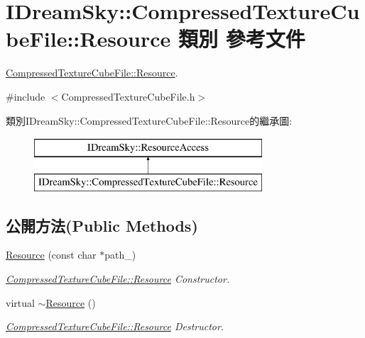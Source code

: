 \hypertarget{class_i_dream_sky_1_1_compressed_texture_cube_file_1_1_resource}{}\section{I\+Dream\+Sky\+:\+:Compressed\+Texture\+Cube\+File\+:\+:Resource 類別 參考文件}
\label{class_i_dream_sky_1_1_compressed_texture_cube_file_1_1_resource}


\hyperlink{class_i_dream_sky_1_1_compressed_texture_cube_file_1_1_resource}{Compressed\+Texture\+Cube\+File\+::\+Resource}.  




{\ttfamily \#include $<$Compressed\+Texture\+Cube\+File.\+h$>$}

類別\+I\+Dream\+Sky\+:\+:Compressed\+Texture\+Cube\+File\+:\+:Resource的繼承圖\+:\begin{figure}[H]
\begin{center}
\leavevmode
\includegraphics[height=2.000000cm]{class_i_dream_sky_1_1_compressed_texture_cube_file_1_1_resource}
\end{center}
\end{figure}
\subsection*{公開方法(Public Methods)}
\begin{DoxyCompactItemize}
\item 
\hyperlink{class_i_dream_sky_1_1_compressed_texture_cube_file_1_1_resource_a5dacae570e1cec4be845638119b512cc}{Resource} (const char $\ast$path\+\_\+)
\begin{DoxyCompactList}\small\item\em \hyperlink{class_i_dream_sky_1_1_compressed_texture_cube_file_1_1_resource}{Compressed\+Texture\+Cube\+File\+::\+Resource} Constructor. \end{DoxyCompactList}\item 
virtual \hyperlink{class_i_dream_sky_1_1_compressed_texture_cube_file_1_1_resource_aac2b5e1e1a4c3f47af472996b9bde573}{$\sim$\+Resource} ()
\begin{DoxyCompactList}\small\item\em \hyperlink{class_i_dream_sky_1_1_compressed_texture_cube_file_1_1_resource}{Compressed\+Texture\+Cube\+File\+::\+Resource} Destructor. \end{DoxyCompactList}\end{DoxyCompactItemize}
